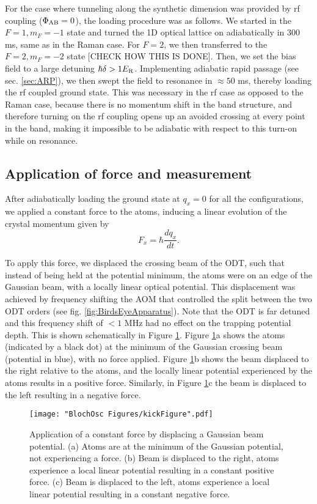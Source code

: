 For the case where tunneling along the synthetic dimension was provided by rf coupling ($\Phi_{\rm AB}=0$), the loading procedure was as follows. We started in the $F=1,m_F=-1$ state and turned the 1D optical lattice on adiabatically in $300$ ms, same as in the Raman case. For $F=2$, we then transferred to the $F=2,m_F=-2$ state [CHECK HOW THIS IS DONE]. Then, we set the bias field to a large detuning $\hbar\delta>1 E_{\rm R}$. Implementing adiabatic rapid passage (see sec. \ref{sec:ARP}), we then swept the field to resonance in $\approx 50$ ms, thereby loading the rf coupled ground state. This was necessary in the rf case as opposed to the Raman case, because there is no momentum shift in the band structure, and therefore turning on the rf coupling opens up an avoided crossing at every point in the band, making it impossible to be adiabatic with respect to this turn-on while on resonance. 

\subsection{Application of force and measurement}\label{sec:forceAndMeasure}
After adiabatically loading the ground state at $q_x=0$ for all the configurations, we applied a constant force to the atoms, inducing a linear evolution of the crystal momentum given by
\begin{equation}
F_x=\hbar\frac{dq_x}{dt}.
\end{equation} 	

To apply this force, we displaced the crossing beam of the ODT, such that instead of being held at the potential minimum, the atoms were on an edge of the Gaussian beam, with a locally linear optical potential. This displacement was achieved by frequency shifting the AOM that controlled the split between the two ODT orders (see fig. \ref{fig:BirdsEyeApparatus}). Note that the ODT is far detuned and this frequency shift of $<1$ MHz had no effect on the trapping potential depth. This is shown schematically in Figure \ref{fig:kickFigure}. Figure \ref{fig:kickFigure}a shows the atoms (indicated by a black dot) at the minimum of the Gaussian crossing beam (potential in blue), with no force applied. Figure \ref{fig:kickFigure}b shows the beam displaced to the right relative to the atoms, and the locally linear potential experienced by the atoms results in a positive force. Similarly, in Figure \ref{fig:kickFigure}c the beam is displaced to the left resulting in a negative force. 

\begin{figure}
\texttt{[image: "BlochOsc Figures/kickFigure".pdf]}
\caption[Application of a constant force by displacing a Gaussian beam potential]{Application of a constant force by displacing a Gaussian beam potential. (a) Atoms are at the minimum of the Gaussian potential, not experiencing a force. (b) Beam is displaced to the right, atoms experience a local linear potential resulting in a constant positive force. (c) Beam is displaced to the left, atoms experience a local linear potential resulting in a constant negative force.  }
\label{fig:kickFigure}
\end{figure}

